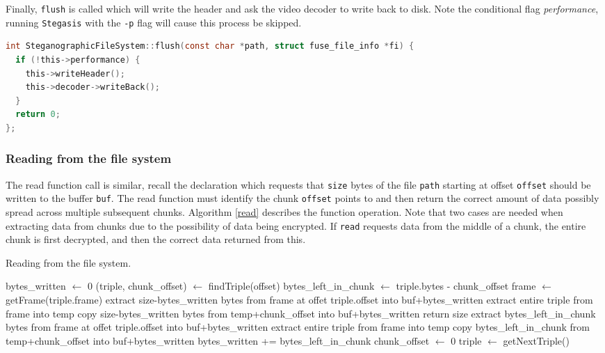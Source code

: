 \documentclass[paper=a4, fontsize=11pt,twoside]{scrartcl}
\numberwithin{table}{section}
\numberwithin{figure}{section}
\numberwithin{algorithm}{section}
\begin{document}
Finally, \texttt{flush} is called which will write the header and ask the video decoder to write back to disk. Note the conditional flag \textit{performance}, running \texttt{Stegasis} with the \texttt{-p} flag will cause this process be skipped.

\begin{lstlisting}[language=C, caption={\texttt{FUSE} flush implementation (\texttt{fs/stegfs.cc:537}).}, frame=single,float,floatplacement=!Htb]
int SteganographicFileSystem::flush(const char *path, struct fuse_file_info *fi) {
  if (!this->performance) {
    this->writeHeader();
    this->decoder->writeBack();
  }
  return 0;
};
\end{lstlisting}

\subsubsection{Reading from the file system}

The read function call is similar, recall the declaration which requests that \texttt{size} bytes of the file \texttt{path} starting at offset \texttt{offset} should be written to the buffer \texttt{buf}. The read function must identify the chunk \texttt{offset} points to and then return the correct amount of data possibly spread across multiple subsequent chunks. Algorithm \ref{read} describes the function operation. Note that two cases are needed when extracting data from chunks due to the possibility of data being encrypted. If \texttt{read} requests data from the middle of a chunk, the entire chunk is first decrypted, and then the correct data returned from this.

\begin{algorithm}[!htb]
\caption{Reading from the file system.}
\label{read}
\begin{algorithmic}[1]
\State bytes\_written $\gets$ 0
\State (triple, chunk\_offset) $\gets$ findTriple(offset)
	\State bytes\_left\_in\_chunk $\gets$ triple.bytes - chunk\_offset
	\State frame $\gets$ getFrame(triple.frame)
			\State extract size-bytes\_written bytes from frame at offet triple.offset into buf+bytes\_written
		\Else
			\State extract entire triple from frame into temp
			\State copy size-bytes\_written bytes from temp+chunk\_offset into buf+bytes\_written 
		\EndIf
		\State return size
	\EndIf
		\State extract bytes\_left\_in\_chunk bytes from frame at offet triple.offset into buf+bytes\_written
	\Else
		\State extract entire triple from frame into temp
		\State copy bytes\_left\_in\_chunk from temp+chunk\_offset into buf+bytes\_written 
	\EndIf
	\State bytes\_written += bytes\_left\_in\_chunk
	\State chunk\_offset $\gets$ 0
	\State triple $\gets$ getNextTriple()
\EndWhile
\end{algorithmic}
\end{algorithm}
\end{document}
